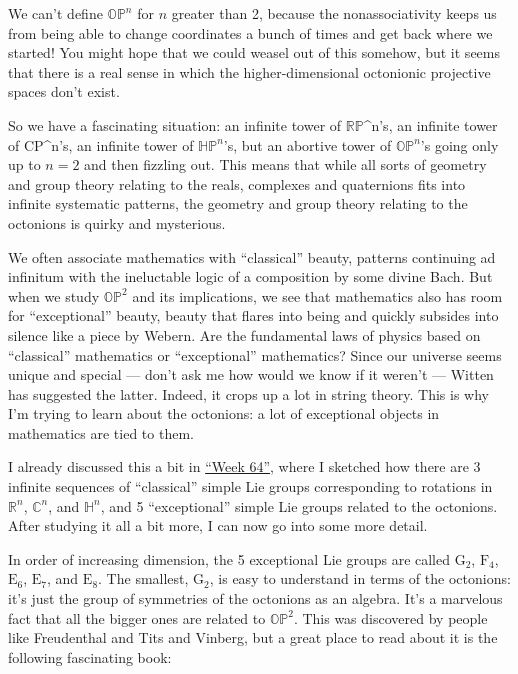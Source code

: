 \documentclass{article}
\begin{document}
We can't define \(\mathbb{OP}^n\) for \(n\) greater than 2, because the
nonassociativity keeps us from being able to change coordinates a bunch
of times and get back where we started! You might hope that we could
weasel out of this somehow, but it seems that there is a real sense in
which the higher-dimensional octonionic projective spaces don't exist.

So we have a fascinating situation: an infinite tower of
\(\mathbb{RP}\)\^{}n's, an infinite tower of CP\^{}n's, an infinite
tower of \(\mathbb{HP}^n\)'s, but an abortive tower of
\(\mathbb{OP}^n\)'s going only up to \(n = 2\) and then fizzling out.
This means that while all sorts of geometry and group theory relating to
the reals, complexes and quaternions fits into infinite systematic
patterns, the geometry and group theory relating to the octonions is
quirky and mysterious.

We often associate mathematics with ``classical'' beauty, patterns
continuing ad infinitum with the ineluctable logic of a composition by
some divine Bach. But when we study \(\mathbb{OP}^2\) and its
implications, we see that mathematics also has room for ``exceptional''
beauty, beauty that flares into being and quickly subsides into silence
like a piece by Webern. Are the fundamental laws of physics based on
``classical'' mathematics or ``exceptional'' mathematics? Since our
universe seems unique and special --- don't ask me how would we know if
it weren't --- Witten has suggested the latter. Indeed, it crops up a
lot in string theory. This is why I'm trying to learn about the
octonions: a lot of exceptional objects in mathematics are tied to them.

I already discussed this a bit in \protect\hyperlink{week64}{``Week
64''}, where I sketched how there are 3 infinite sequences of
``classical'' simple Lie groups corresponding to rotations in
\(\mathbb{R}^n\), \(\mathbb{C}^n\), and \(\mathbb{H}^n\), and 5
``exceptional'' simple Lie groups related to the octonions. After
studying it all a bit more, I can now go into some more detail.

In order of increasing dimension, the 5 exceptional Lie groups are
called \(\mathrm{G}_2\), \(\mathrm{F}_4\), \(\mathrm{E}_6\),
\(\mathrm{E}_7\), and \(\mathrm{E}_8\). The smallest, \(\mathrm{G}_2\),
is easy to understand in terms of the octonions: it's just the group of
symmetries of the octonions as an algebra. It's a marvelous fact that
all the bigger ones are related to \(\mathbb{OP}^2\). This was
discovered by people like Freudenthal and Tits and Vinberg, but a great
place to read about it is the following fascinating book:
\end{document}
